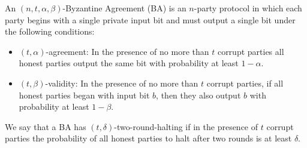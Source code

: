 \begin{definition}
An $(n,t,\alpha,\beta)$-Byzantine Agreement (BA) is an $n$-party protocol in which each party begins with a single private input bit and must output a single bit under the following conditions:
\begin{itemize}
	\item $(t,\alpha)$-agreement: In the presence of no more than $t$ corrupt parties all honest parties output the same bit with probability at least $1-\alpha$.
	\item $(t,\beta)$-validity: In the presence of no more than $t$ corrupt parties, if all honest parties began with input bit $b$, then they also output $b$ with probability at least $1-\beta$.
\end{itemize}
We say that a BA has $(t,\delta)$-two-round-halting if in the presence of $t$ corrupt parties the probability of all honest parties to halt after two rounds is at least $\delta$.
\end{definition}

